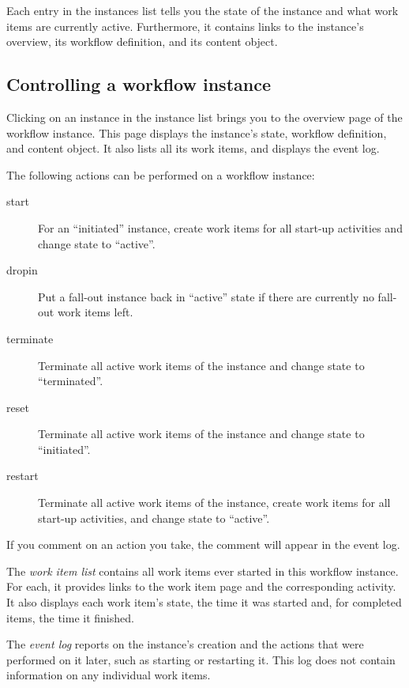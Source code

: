Each entry in the instances list tells you the state of the instance and what
work items are currently active. Furthermore, it contains links to the
instance's overview, its workflow definition, and its content object.


\subsection{Controlling a workflow instance}

Clicking on an instance in the instance list brings you to the overview page of
the workflow instance.  This page displays the instance's state, workflow
definition, and content object. It also lists all its work items, and displays
the event log.

The following actions can be performed on a workflow instance:
\begin{description}
\item[start] For an ``initiated'' instance, create work items for all start-up
  activities and change state to ``active''.
\item[dropin] Put a fall-out instance back in ``active'' state if there are
  currently no fall-out work items left.
\item[terminate] Terminate all active work items of the instance and change
  state to ``terminated''.
\item[reset] Terminate all active work items of the instance and change state
  to ``initiated''.
\item[restart] Terminate all active work items of the instance, create work
  items for all start-up activities, and change state to ``active''.
\end{description}
If you comment on an action you take, the comment will appear in the event
log.

The \emph{work item list} contains all work items ever started in this workflow
instance. For each, it provides links to the work item page and the
corresponding activity. It also displays each work item's state, the time it
was started and, for completed items, the time it finished.

The \emph{event log} reports on the instance's creation and the actions that were
performed on it later, such as starting or restarting it. This log does not
contain information on any individual work items.

